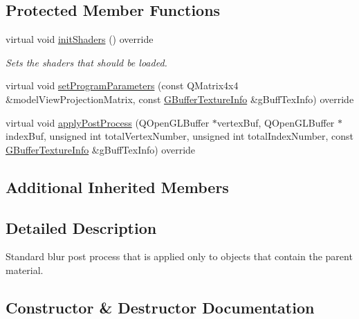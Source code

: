 \subsection*{Protected Member Functions}
\begin{DoxyCompactItemize}
\item 
\mbox{\label{class_geometry_engine_1_1_custom_shading_1_1_material_grey_scale_a9b9d6e34a5d61dd7d6ede69602d4b420}} 
virtual void \mbox{\hyperlink{class_geometry_engine_1_1_custom_shading_1_1_material_grey_scale_a9b9d6e34a5d61dd7d6ede69602d4b420}{init\+Shaders}} () override
\begin{DoxyCompactList}\small\item\em Sets the shaders that should be loaded. \end{DoxyCompactList}\item 
virtual void \mbox{\hyperlink{class_geometry_engine_1_1_custom_shading_1_1_material_grey_scale_add050c593a0f3a515b4b149439e983bb}{set\+Program\+Parameters}} (const Q\+Matrix4x4 \&model\+View\+Projection\+Matrix, const \mbox{\hyperlink{class_geometry_engine_1_1_g_buffer_texture_info}{G\+Buffer\+Texture\+Info}} \&g\+Buff\+Tex\+Info) override
\item 
virtual void \mbox{\hyperlink{class_geometry_engine_1_1_custom_shading_1_1_material_grey_scale_a1b3bf70a4e714e7c456203f2dee1ffec}{apply\+Post\+Process}} (Q\+Open\+G\+L\+Buffer $\ast$vertex\+Buf, Q\+Open\+G\+L\+Buffer $\ast$index\+Buf, unsigned int total\+Vertex\+Number, unsigned int total\+Index\+Number, const \mbox{\hyperlink{class_geometry_engine_1_1_g_buffer_texture_info}{G\+Buffer\+Texture\+Info}} \&g\+Buff\+Tex\+Info) override
\end{DoxyCompactItemize}
\subsection*{Additional Inherited Members}


\subsection{Detailed Description}
Standard blur post process that is applied only to objects that contain the parent material. 

\subsection{Constructor \& Destructor Documentation}
\mbox{\label{class_geometry_engine_1_1_custom_shading_1_1_material_grey_scale_af34c70eefcc14f4dc9a91f98eb60184b}} 
